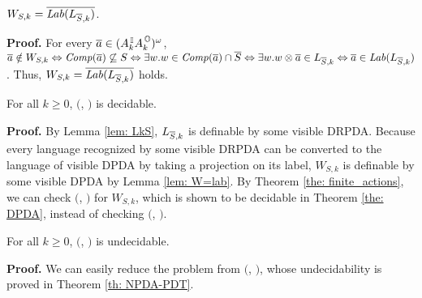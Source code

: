 \begin{lemma}  \label{lem: W=lab}
$W_{S,k} = \overline{\mathit{Lab}(L_{\overline{S},k})}$.
\end{lemma}
{\bf Proof.}\quad
For every $\overline{a}\in(A_k^{\, \mathbb{I}} A_k^{\, \mathbb{O}})^\omega$,
$\overline{a}\notin W_{S,k} \Leftrightarrow {\mathit{Comp}}(\overline{a})\not\subseteq S
\Leftrightarrow \exists w. w\in {\mathit{Comp}}(\overline{a})\cap \overline{S}
\Leftrightarrow \exists w. w\otimes\overline{a}\in L_{\overline{S},k}
\Leftrightarrow \overline{a}\in\mathit{Lab}(L_{\overline{S},k})$.
Thus, $W_{S,k} = \overline{\mathit{Lab}(L_{\overline{S},k})}$ holds.

\begin{theorem}
For all $k\geq 0$, \Real $($\DRPDAv, \RPDTk$)$ is decidable.
\end{theorem}
{\bf Proof.}\quad
By Lemma \ref{lem: LkS}, $L_{\overline{S},k}$ is definable by some visible DRPDA.
Because every language recognized by some visible DRPDA can be converted to
the language of visible DPDA by taking a projection on its label,
$W_{S,k}$ is definable by some visible DPDA by Lemma \ref{lem: W=lab}.
By Theorem \ref{the: finite_actions}, we can check \Real $($\DPDA, \PDT$)$ for $W_{S,k}$, which is shown to be decidable in Theorem \ref{the: DPDA}, instead of checking \Real $($\DRPDAv, \RPDTk$)$.

\begin{theorem}
For all $k\geq 0$, \Real $($\NRPDA, \RPDTk$)$ is undecidable.
\end{theorem}
{\bf Proof.}\quad
We can easily reduce the problem from \Real $($\NPDA, \PDT$)$,
whose undecidability is proved in Theorem \ref{th: NPDA-PDT}.














